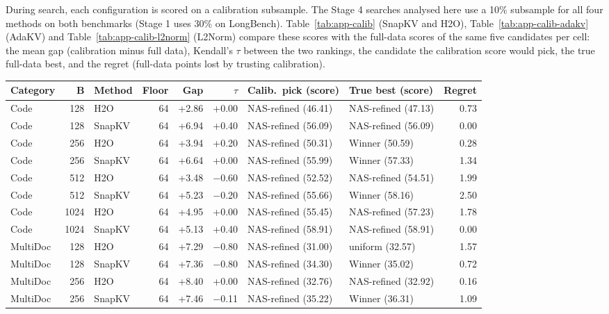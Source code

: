 During search, each configuration is scored on a calibration subsample. The Stage 4 searches analysed here use a 10\% subsample for all four methods on both benchmarks (Stage 1 uses 30\% on LongBench). Table~\ref{tab:app-calib} (SnapKV and H2O), Table~\ref{tab:app-calib-adakv} (AdaKV) and Table~\ref{tab:app-calib-l2norm} (L2Norm) compare these scores with the full-data scores of the same five candidates per cell: the mean gap (calibration minus full data), Kendall's $\tau$ between the two rankings, the candidate the calibration score would pick, the true full-data best, and the regret (full-data points lost by trusting calibration).

\begin{table}[t]
  \centering
  \footnotesize
  \setlength{\tabcolsep}{4pt}
  \begin{tabular}{@{}l r l r r r l l r@{}}
    \toprule
    Category & B & Method & Floor & Gap & $\tau$ & Calib.\ pick (score) & True best (score) & Regret \\
    \midrule
    Code & 128 & H2O & 64 & +2.86 & +0.00 & NAS-refined (46.41) & NAS-refined (47.13) & 0.73 \\
    Code & 128 & SnapKV & 64 & +6.94 & +0.40 & NAS-refined (56.09) & NAS-refined (56.09) & 0.00 \\
    Code & 256 & H2O & 64 & +3.94 & +0.20 & NAS-refined (50.31) & Winner (50.59) & 0.28 \\
    Code & 256 & SnapKV & 64 & +6.64 & +0.00 & NAS-refined (55.99) & Winner (57.33) & 1.34 \\
    Code & 512 & H2O & 64 & +3.48 & $-$0.60 & NAS-refined (52.52) & NAS-refined (54.51) & 1.99 \\
    Code & 512 & SnapKV & 64 & +5.23 & $-$0.20 & NAS-refined (55.66) & Winner (58.16) & 2.50 \\
    Code & 1024 & H2O & 64 & +4.95 & +0.00 & NAS-refined (55.45) & NAS-refined (57.23) & 1.78 \\
    Code & 1024 & SnapKV & 64 & +5.13 & +0.40 & NAS-refined (58.91) & NAS-refined (58.91) & 0.00 \\
    MultiDoc & 128 & H2O & 64 & +7.29 & $-$0.80 & NAS-refined (31.00) & uniform (32.57) & 1.57 \\
    MultiDoc & 128 & SnapKV & 64 & +7.36 & $-$0.80 & NAS-refined (34.30) & Winner (35.02) & 0.72 \\
    MultiDoc & 256 & H2O & 64 & +8.40 & +0.00 & NAS-refined (32.76) & NAS-refined (32.92) & 0.16 \\
    MultiDoc & 256 & SnapKV & 64 & +7.46 & $-$0.11 & NAS-refined (35.22) & Winner (36.31) & 1.09 \\

\end{tabular}
\end{table}

